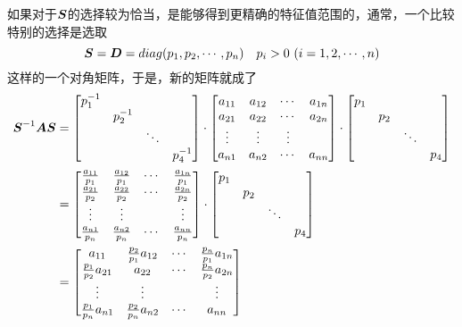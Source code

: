 \documentclass[12pt, a4paper, oneside, UTF8]{ctexbook}
\begin{document}
如果对于$\boldsymbol{S}$的选择较为恰当，是能够得到更精确的特征值范围的，通常，一个比较特别的选择是选取\[\bs{S}=\D=diag(p_1, p_2,\cdots,p_n)\ \ \ p_i>0\ (i=1,2,\cdots,n)\]这样的一个对角矩阵，于是，新的矩阵就成了
\[
\begin{aligned}
\boldsymbol{S}^{-1}\boldsymbol{A}\boldsymbol{S}&=\begin{bmatrix}
    p_1^{-1}&&&\\
    &p_2^{-1}&&\\
    &&\ddots &\\
    &&&p_4^{-1}
\end{bmatrix}\cdot
\begin{bmatrix}
    a_{11}&a_{12}&\cdots&a_{1n}\\
    a_{21}&a_{22}&\cdots&a_{2n}\\
    \vdots&\vdots&\vdots\\
    a_{n1}&a_{n2}&\cdots&a_{nn}
\end{bmatrix}\cdot
\begin{bmatrix}
    p_1&&&\\
    &p_2&&\\
    &&\ddots &\\
    &&&p_4
\end{bmatrix}\\
&=\begin{bmatrix}
    \frac{a_{11}}{p_1}&\frac{a_{12}}{p_1}&\cdots&\frac{a_{1n}}{p_1}\\
    \frac{a_{21}}{p_2}&\frac{a_{22}}{p_2}&\cdots&\frac{a_{2n}}{p_2}\\
    \vdots&\vdots&&\vdots\\
    \frac{a_{n1}}{p_n}&\frac{a_{n2}}{p_n}&\cdots&\frac{a_{nn}}{p_n}
\end{bmatrix}\cdot
\begin{bmatrix}
    p_1&&&\\
    &p_2&&\\
    &&\ddots &\\
    &&&p_4
\end{bmatrix}\\
&=\begin{bmatrix}
    a_{11}&\frac{p_2}{p_1}a_{12}&\cdots&\frac{p_n}{p_1}a_{1n}\\
    \frac{p_1}{p_2}a_{21}&a_{22}&\cdots&\frac{p_n}{p_2}a_{2n}\\
    \vdots&\vdots&&\vdots\\
    \frac{p_1}{p_n}a_{n1}&\frac{p_2}{p_n}a_{n2}&\cdots&a_{nn}
\end{bmatrix}
\end{aligned}
\]
\end{document}
